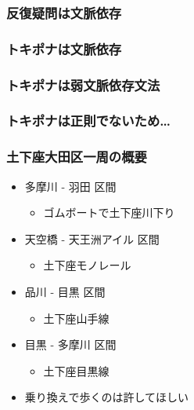 \documentclass[14pt]{beamer}
\theoremstyle{definition}
\begin{document}
\begin{frame}
	\frametitle{反復疑問は文脈依存}
\end{frame}


\begin{frame}
	\frametitle{トキポナは文脈依存}
\end{frame}


\begin{frame}
	\frametitle{トキポナは弱文脈依存文法}
\end{frame}


\begin{frame}
	\frametitle{トキポナは正則でないため…}
\end{frame}


\begin{frame}
	\frametitle{土下座大田区一周の概要}

	\begin{itemize}
		\item 多摩川 - 羽田 区間
			\begin{itemize}
				\item ゴムボートで土下座川下り
			\end{itemize}
		\item 天空橋 - 天王洲アイル 区間
			\begin{itemize}
				\item 土下座モノレール
			\end{itemize}
		\item 品川 - 目黒 区間
			\begin{itemize}
				\item 土下座山手線
			\end{itemize}
		\item 目黒 - 多摩川 区間
			\begin{itemize}
				\item 土下座目黒線
			\end{itemize}
		\item 乗り換えで歩くのは許してほしい
	\end{itemize}

\end{frame}
\end{document}
